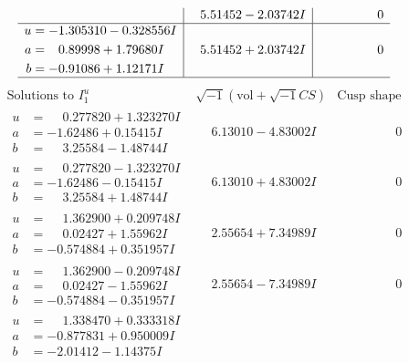 \documentclass[1p]{elsarticle_modified}
\theoremstyle{definition}
\newcommand{\I}{\sqrt{-1}}
\begin{document}
$$\begin{array}{c|c|c}
 & \phantom{-}5.51452 - 2.03742 I & \phantom{-0.000000 } 0 \\ \hline\begin{aligned}
u &= -1.305310 - 0.328556 I \\
a &= \phantom{-}0.89998 + 1.79680 I \\
b &= -0.91086 + 1.12171 I\end{aligned}
 & \phantom{-}5.51452 + 2.03742 I & \phantom{-0.000000 } 0\\
 \hline 
 \end{array}$$\newpage$$\begin{array}{c|c|c}  
\text{Solutions to }I^u_{1}& \I (\text{vol} + \sqrt{-1}CS) & \text{Cusp shape}\\
 \hline 
\begin{aligned}
u &= \phantom{-}0.277820 + 1.323270 I \\
a &= -1.62486 + 0.15415 I \\
b &= \phantom{-}3.25584 - 1.48744 I\end{aligned}
 & \phantom{-}6.13010 - 4.83002 I & \phantom{-0.000000 } 0 \\ \hline\begin{aligned}
u &= \phantom{-}0.277820 - 1.323270 I \\
a &= -1.62486 - 0.15415 I \\
b &= \phantom{-}3.25584 + 1.48744 I\end{aligned}
 & \phantom{-}6.13010 + 4.83002 I & \phantom{-0.000000 } 0 \\ \hline\begin{aligned}
u &= \phantom{-}1.362900 + 0.209748 I \\
a &= \phantom{-}0.02427 + 1.55962 I \\
b &= -0.574884 + 0.351957 I\end{aligned}
 & \phantom{-}2.55654 + 7.34989 I & \phantom{-0.000000 } 0 \\ \hline\begin{aligned}
u &= \phantom{-}1.362900 - 0.209748 I \\
a &= \phantom{-}0.02427 - 1.55962 I \\
b &= -0.574884 - 0.351957 I\end{aligned}
 & \phantom{-}2.55654 - 7.34989 I & \phantom{-0.000000 } 0 \\ \hline\begin{aligned}
u &= \phantom{-}1.338470 + 0.333318 I \\
a &= -0.877831 + 0.950009 I \\
b &= -2.01412 - 1.14375 I\end{aligned}

\end{array}$$
\end{document}
